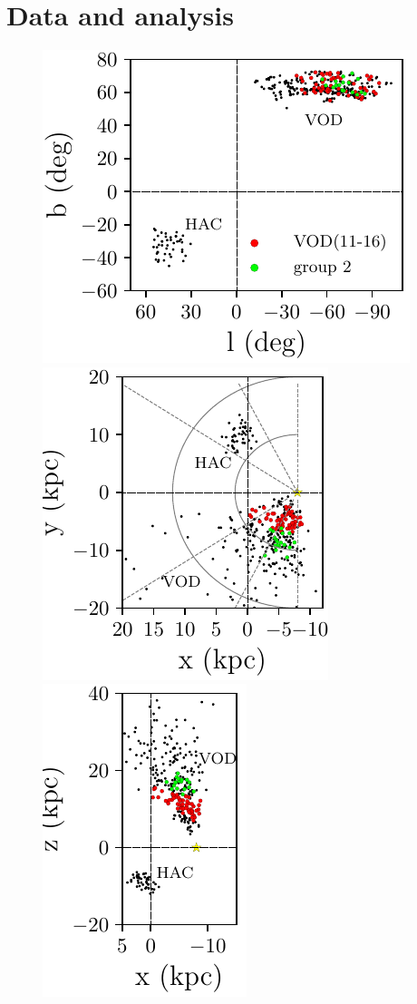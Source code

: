 \documentclass[fleqn,usenatbib]{mnras}
\begin{document}
\section{Data and analysis}
%
\begin{figure}
	\includegraphics[scale=0.515]{lb.pdf}
	\includegraphics[scale=0.515]{xy.pdf}
	\includegraphics[scale=0.515]{xz.pdf}

\end{figure}
\end{document}
